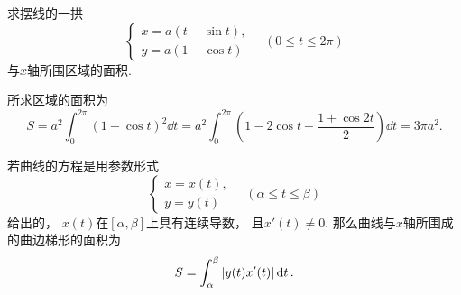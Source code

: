 \begin{example}
求摆线的一拱\begin{equation*}
	\left\{ \begin{array}{l}
		x = a (t - \sin t), \\
		y = a (1 - \cos t)
	\end{array} \right.
	\quad(0 \leq t \leq 2\pi)
\end{equation*}与\(x\)轴所围区域的面积.
\begin{solution}
所求区域的面积为\begin{equation*}
	S = a^2 \int_0^{2\pi} (1-\cos t)^2 \dd{t}
	= a^2 \int_0^{2\pi} \left(
		1 - 2 \cos t + \frac{1 + \cos2t}2
	\right) \dd{t}
	= 3\pi a^2.
\end{equation*}
\end{solution}
\end{example}

若曲线的方程是用参数形式\begin{equation*}
	\left\{ \begin{array}{l}
		x = x(t), \\
		y = y(t)
	\end{array} \right.
	\quad(\alpha \leq t \leq \beta)
\end{equation*}给出的，
\(x(t)\)在\([\alpha,\beta]\)上具有连续导数，
且\(x'(t)\neq0\).
那么曲线与\(x\)轴所围成的曲边梯形的面积为\begin{equation}
	S = \int_\alpha^\beta \abs{y(t) x'(t)} \dd{t}.
\end{equation}

